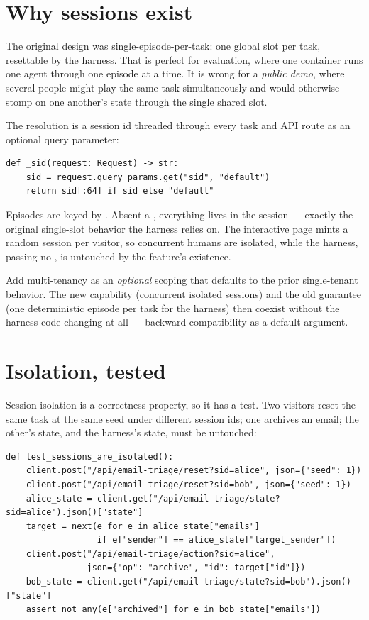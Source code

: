 \documentclass[11pt,openany]{book}
\newcommand{\code}[1]{\textcolor{clayd}{\texttt{\detokenize{#1}}}}
\begin{document}
\section{Why sessions exist}

The original design was single-episode-per-task: one global slot per task,
resettable by the harness. That is perfect for evaluation, where one container
runs one agent through one episode at a time. It is wrong for a \emph{public
demo}, where several people might play the same task simultaneously and would
otherwise stomp on one another's state through the single shared slot.

The resolution is a session id threaded through every task and API route as an
optional query parameter:

\begin{lstlisting}[style=py]
def _sid(request: Request) -> str:
    sid = request.query_params.get("sid", "default")
    return sid[:64] if sid else "default"
\end{lstlisting}

Episodes are keyed by \code{(sid, task_id)}. Absent a \code{sid}, everything
lives in the \code{default} session — exactly the original single-slot behavior
the harness relies on. The interactive \code{/play} page mints a random session
per visitor, so concurrent humans are isolated, while the harness, passing no
\code{sid}, is untouched by the feature's existence.

\begin{principle}[.\ ]
Add multi-tenancy as an \emph{optional} scoping that defaults to the prior
single-tenant behavior. The new capability (concurrent isolated sessions) and the
old guarantee (one deterministic episode per task for the harness) then coexist
without the harness code changing at all — backward compatibility as a default
argument.
\end{principle}

\section{Isolation, tested}

Session isolation is a correctness property, so it has a test. Two visitors reset
the same task at the same seed under different session ids; one archives an email;
the other's state, and the harness's \code{default} state, must be untouched:

\begin{lstlisting}[style=py]
def test_sessions_are_isolated():
    client.post("/api/email-triage/reset?sid=alice", json={"seed": 1})
    client.post("/api/email-triage/reset?sid=bob", json={"seed": 1})
    alice_state = client.get("/api/email-triage/state?sid=alice").json()["state"]
    target = next(e for e in alice_state["emails"]
                  if e["sender"] == alice_state["target_sender"])
    client.post("/api/email-triage/action?sid=alice",
                json={"op": "archive", "id": target["id"]})
    bob_state = client.get("/api/email-triage/state?sid=bob").json()["state"]
    assert not any(e["archived"] for e in bob_state["emails"])
\end{lstlisting}
\end{document}
